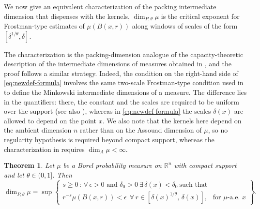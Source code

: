 \documentclass[12pt]{amsart}
\newtheorem{theorem}{Theorem}[section]
\theoremstyle{definition}
\theoremstyle{remark}
\numberwithin{equation}{section}
\begin{document}
We now give an equivalent characterization of the packing intermediate
dimension that dispenses with the kernels, $\dim_{P,\theta}\mu$ is the
critical exponent for Frostman-type estimates of $\mu(B(x,r))$ along
windows of scales of the form $[\delta^{1/\theta},\delta]$. 

The characterization is
the packing-dimension analogue of the capacity-theoretic description of
the intermediate dimensions of measures obtained in
\cite[Theorem 5.6]{ANGELINI2026130039}, and the proof follows a similar
strategy. Indeed, the condition on the right-hand side of
\eqref{eq:newdef-formula} involves the same two-scale Frostman-type
condition used in \cite[Definition 3.1]{ANGELINI2026130039} to define
the Minkowski intermediate dimensions of a measure. The difference lies
in the quantifiers: there, the constant and the scales are required to
be uniform over the support (see also
\cite[Lemma 3.3]{ANGELINI2026130039}), whereas in
\eqref{eq:newdef-formula} the scales $\delta(x)$ are allowed to depend
on the point $x$. We also note that the kernels here depend on the
ambient dimension $n$ rather than on the Assouad dimension of $\mu$, so
no regularity hypothesis is required beyond compact support, whereas
the characterization in \cite{ANGELINI2026130039} requires
$\dim_A\mu<\infty$.



\begin{theorem}\label{newdef}Let $\mu$ be a Borel probability measure on $\mathbb{R}^n$ with compact support and let $\theta\in(0,1]$. Then\begin{equation}\label{eq:newdef-formula}    \dim_{P,\theta} \mu = \sup\left\{\begin{array}{c}s\geq 0 \, : \, \forall\, \epsilon>0 \text{ and } \delta_0>0\ \exists\, \delta(x)<\delta_0\ \text{such that} \\[2mm]r^{-s}\mu(B(x,r))<\epsilon\ \ \forall\, r\in[\delta(x)^{1/\theta},\,\delta(x)],\ \ \text{ for } \mu\text{-a.e.\ } x\end{array}\right\}.\end{equation} \end{theorem}
\end{document}
